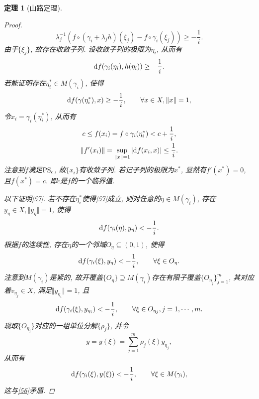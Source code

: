 \documentclass[12pt,a4paper]{article}
\newtheorem{theorem}{定理}[section]
\begin{document}
\begin{theorem}[山路定理]
\begin{proof}
\begin{equation*}
            \lambda_j^{-1}(f \circ (\gamma_i + \lambda_jh)(\xi_j) - f \circ \gamma_i(\xi_j)) \geq -\frac{1}{i}.
        \end{equation*}
        由于$\{\xi_j\}$, 故存在收敛子列. 设收敛子列的极限为$\eta_i$, 从而有 
        \begin{equation}\label{56}
            {\rm d}f(\gamma_i(\eta_i), h(\eta_i)) \geq -\frac{1}{i}.
        \end{equation}
        若能证明存在$\eta_i^* \in M(\gamma_i)$, 使得 
        \begin{equation}\label{57}
            {\rm d}f(\gamma(\eta_i^*), x) \geq -\frac{1}{i}, \qquad \forall x \in X, \Vert x \Vert = 1,
        \end{equation}
        令$x_i = \gamma_i(\eta_i^*)$, 从而有
        \begin{gather*}
            c \leq f(x_i) = f \circ \gamma_i(\eta_i^*) < c + \frac{1}{i}, \\ 
            \Vert f'(x_i)\Vert = \sup_{\Vert x \Vert = 1}|{\rm d}f(x_i, x)| \leq \frac{1}{i}. 
        \end{gather*}
        注意到$f$满足${\rm PS}_c$, 故$\{x_i\}$有收敛子列. 若记子列的极限为$x^*$, 显然有$f'(x^*) = 0$, 且$f(x^*) = c$.
        即$c$是$f$的一个临界值.

        以下证明\eqref{57}. 若不存在$\eta_i^*$使得\eqref{57}成立, 则对任意的$\eta \in M(\gamma_i)$, 存在$y_{\eta} \in X, \Vert y_{\eta}\Vert = 1$, 使得 
        \begin{equation*}
            {\rm d}f(\gamma_i(\eta), y_{\eta}) < -\frac{1}{i}.
        \end{equation*} 
        根据$f$的连续性, 存在$\eta$的一个邻域$O_{\eta} \subseteq (0, 1)$, 使得 
        \begin{equation*}
            {\rm d}f(\gamma_i(\xi), y_{\eta}) < -\frac{1}{i}, \qquad \forall \xi \in O_{\eta}.
        \end{equation*}
        注意到$M(\gamma_i)$是紧的, 故开覆盖$\{O_{\eta}\} \supseteq M(\gamma_i)$存在有限子覆盖$\{O_{\eta_j}\}_{j = 1}^m$, 其对应着$v_{\eta_j} \in X$, 满足$\Vert y_{\eta_i}\Vert = 1$, 且 
        \begin{equation*}
            {\rm d}f(\gamma_i(\xi), y_{\eta_i}) < -\frac{1}{i}, \qquad \forall \xi \in O_{\eta_j}, j = 1, \cdots, m.
        \end{equation*}
        现取$\{O_{\eta_j}\}$对应的一组单位分解$\{\rho_j\}$, 并令
        \begin{equation*}
            y = y(\xi) = \sum_{j = 1}^m\rho_j(\xi)y_{\eta_j},
        \end{equation*}
        从而有 
        \begin{equation*}
            {\rm d}f(\gamma_i(\xi), y(\xi)) < -\frac{1}{i}, \qquad \forall \xi \in M(\gamma_i),
        \end{equation*}
        这与\eqref{56}矛盾.
    \end{proof}
\end{theorem}
\end{document}
